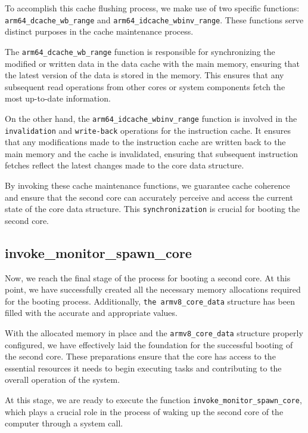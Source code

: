 To accomplish this cache flushing process, we make use of two specific functions: \texttt{arm64\_dcache\_wb\_range} and \texttt{arm64\_idcache\_wbinv\_range}. These functions serve distinct purposes in the cache maintenance process.

The \texttt{arm64\_dcache\_wb\_range} function is responsible for synchronizing the modified or written data in the data cache with the main memory, ensuring that the latest version of the data is stored in the memory. This ensures that any subsequent read operations from other cores or system components fetch the most up-to-date information.

On the other hand, the \texttt{arm64\_idcache\_wbinv\_range} function is involved in the \texttt{invalidation} and \texttt{write-back} operations for the instruction cache. It ensures that any modifications made to the instruction cache are written back to the main memory and the cache is invalidated, ensuring that subsequent instruction fetches reflect the latest changes made to the core data structure.

By invoking these cache maintenance functions, we guarantee cache coherence and ensure that the second core can accurately perceive and access the current state of the core data structure. This \texttt{synchronization} is crucial for booting the second core.

\subsection{invoke\_monitor\_spawn\_core}

Now, we reach the final stage of the process for booting a second core. At this point, we have successfully created all the necessary memory allocations required for the booting process. Additionally, \texttt{the armv8\_core\_data} structure has been filled with the accurate and appropriate values.

With the allocated memory in place and the \texttt{armv8\_core\_data} structure properly configured, we have effectively laid the foundation for the successful booting of the second core. These preparations ensure that the core has access to the essential resources it needs to begin executing tasks and contributing to the overall operation of the system.

At this stage, we are ready to execute the function \texttt{invoke\_monitor\_spawn\_core}, which plays a crucial role in the process of waking up the second core of the computer through a system call.

